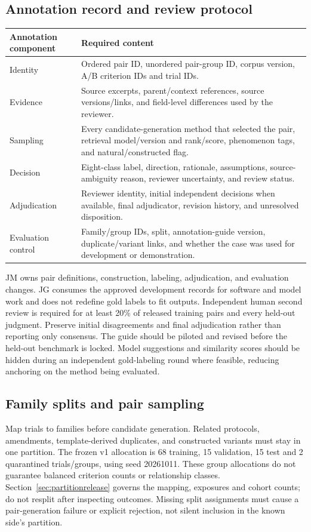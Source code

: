 \documentclass[10pt,letterpaper]{article}
\begin{document}
\subsection{Annotation record and review protocol}
\begin{longtable}{L{.26\linewidth}L{.66\linewidth}}
\toprule Annotation component & Required content\\\midrule
\endhead
Identity & Ordered pair ID, unordered pair-group ID, corpus version, A/B criterion IDs and trial IDs.\\
Evidence & Source excerpts, parent/context references, source versions/links, and field-level differences used by the reviewer.\\
Sampling & Every candidate-generation method that selected the pair, retrieval model/version and rank/score, phenomenon tags, and natural/constructed flag.\\
Decision & Eight-class label, direction, rationale, assumptions, source-ambiguity reason, reviewer uncertainty, and review status.\\
Adjudication & Reviewer identity, initial independent decisions when available, final adjudicator, revision history, and unresolved disposition.\\
Evaluation control & Family/group IDs, split, annotation-guide version, duplicate/variant links, and whether the case was used for development or demonstration.\\\bottomrule
\end{longtable}

JM owns pair definitions, construction, labeling, adjudication, and evaluation
changes. JG consumes the approved development records for software and model
work and does not redefine gold labels to fit outputs. Independent human second review is required for at least 20\% of released
training pairs and every held-out judgment. Preserve initial disagreements
and final adjudication rather than reporting only consensus. The guide should be piloted and revised
before the held-out benchmark is locked. Model suggestions and similarity
scores should be hidden during an independent gold-labeling round where
feasible, reducing anchoring on the method being evaluated.

\subsection{Family splits and pair sampling}
Map trials to families before candidate generation. Related protocols,
amendments, template-derived duplicates, and constructed variants must stay
in one partition. The frozen v1 allocation is 68 training, 15 validation,
15 test and 2 quarantined trials/groups, using seed 20261011. These group
allocations do not guarantee balanced criterion counts or relationship
classes. Section~\ref{sec:partitionrelease} governs the mapping, exposures
and cohort counts; do not resplit after inspecting outcomes.
Missing split assignments must cause a pair-generation failure or explicit
rejection, not silent inclusion in the known side's partition.
\end{document}

